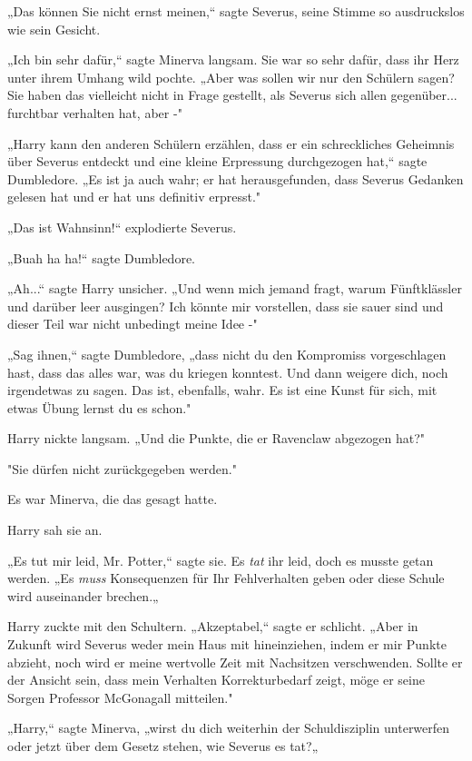 {„Das können Sie nicht ernst meinen,“ sagte Severus, seine Stimme so ausdruckslos wie sein Gesicht.

„Ich bin sehr dafür,“ sagte Minerva langsam. Sie war so sehr dafür, dass ihr Herz unter ihrem Umhang wild pochte. „Aber was sollen wir nur den Schülern sagen? Sie haben das vielleicht nicht in Frage gestellt, als Severus sich allen gegenüber... furchtbar verhalten hat, aber -"

„Harry kann den anderen Schülern erzählen, dass er ein schreckliches Geheimnis über Severus entdeckt und eine kleine Erpressung durchgezogen hat,“ sagte Dumbledore. „Es ist ja auch wahr; er hat herausgefunden, dass Severus Gedanken gelesen hat und er hat uns definitiv erpresst."

„Das ist Wahnsinn!“ explodierte Severus.

„Buah ha ha!“ sagte Dumbledore.

„Ah...“ sagte Harry unsicher. „Und wenn mich jemand fragt, warum Fünftklässler und darüber leer ausgingen? Ich könnte mir vorstellen, dass sie sauer sind und dieser Teil war nicht unbedingt meine Idee -"

„Sag ihnen,“ sagte Dumbledore, „dass nicht du den Kompromiss vorgeschlagen hast, dass das alles war, was du kriegen konntest. Und dann weigere dich, noch irgendetwas zu sagen. Das ist, ebenfalls, wahr. Es ist eine Kunst für sich, mit etwas Übung lernst du es schon."

Harry nickte langsam. „Und die Punkte, die er Ravenclaw abgezogen hat?"

"Sie dürfen nicht zurückgegeben werden."

Es war Minerva, die das gesagt hatte.

Harry sah sie an.

„Es tut mir leid, Mr. Potter,“ sagte sie. Es \emph{tat} ihr leid, doch es musste getan werden. „Es \emph{muss} Konsequenzen für Ihr Fehlverhalten geben oder diese Schule wird auseinander brechen.„

Harry zuckte mit den Schultern. „Akzeptabel,“ sagte er schlicht. „Aber in Zukunft wird Severus weder mein Haus mit hineinziehen, indem er mir Punkte abzieht, noch wird er meine wertvolle Zeit mit Nachsitzen verschwenden. Sollte er der Ansicht sein, dass mein Verhalten Korrekturbedarf zeigt, möge er seine Sorgen Professor McGonagall mitteilen."

„Harry,“ sagte Minerva, „wirst du dich weiterhin der Schuldisziplin unterwerfen oder jetzt über dem Gesetz stehen, wie Severus es tat?„

}
